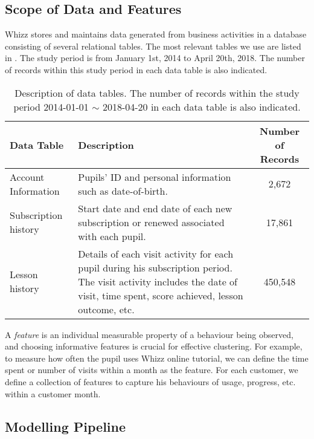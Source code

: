 \documentclass[english,a4,oneside,9pt]{extarticle}
\begin{document}
\subsection*{Scope of Data and Features}

Whizz stores and maintains data generated from business activities in a database consisting of several relational tables. The most relevant tables we use are listed in . The study period is from January 1st, 2014 to April 20th, 2018. The number of records within this study period in each data table is also indicated.

\begin{table}[!h]
\centering
\footnotesize
\begin{tabular}{l|p{6cm}|c}
\hline
\textbf{Data Table} & \textbf{Description} & \textbf{Number of Records} \\
\hline
Account Information &
Pupils' ID and personal information such as date-of-birth. &
2,672 \\
\hline
Subscription history &
Start date and end date of each new subscription or renewed associated with each pupil. &
17,861 \\
\hline
Lesson history &
Details of each visit activity for each pupil during his subscription period. The visit activity includes the date of visit, time spent, score achieved, lesson outcome, etc. &
450,548 \\
\hline
\end{tabular}
\caption{Description of data tables. The number of records within the study period 2014-01-01 $\sim$ 2018-04-20 in each data table is also indicated.}
\label{tab:dataTable}
\end{table}

A \textit{feature} is an individual measurable property of a behaviour being observed, and choosing informative features is crucial for effective clustering. For example, to measure how often the pupil uses Whizz online tutorial, we can define the time spent or number of visits within a month as the feature. For each customer, we define a collection of features to capture his behaviours of usage, progress, etc. within a customer month.

\subsection*{Modelling Pipeline}
\end{document}
